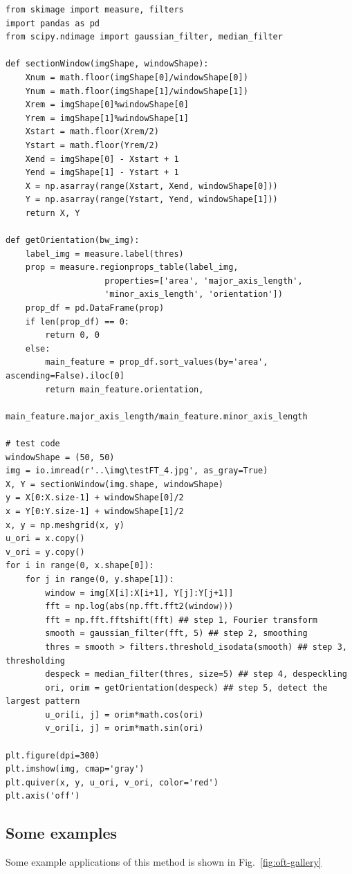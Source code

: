 \begin{verbatim}
from skimage import measure, filters
import pandas as pd
from scipy.ndimage import gaussian_filter, median_filter

def sectionWindow(imgShape, windowShape):
    Xnum = math.floor(imgShape[0]/windowShape[0])
    Ynum = math.floor(imgShape[1]/windowShape[1])
    Xrem = imgShape[0]%windowShape[0]
    Yrem = imgShape[1]%windowShape[1]
    Xstart = math.floor(Xrem/2)
    Ystart = math.floor(Yrem/2)
    Xend = imgShape[0] - Xstart + 1
    Yend = imgShape[1] - Ystart + 1
    X = np.asarray(range(Xstart, Xend, windowShape[0]))
    Y = np.asarray(range(Ystart, Yend, windowShape[1]))
    return X, Y

def getOrientation(bw_img):
    label_img = measure.label(thres)
    prop = measure.regionprops_table(label_img,
                    properties=['area', 'major_axis_length',
                    'minor_axis_length', 'orientation'])
    prop_df = pd.DataFrame(prop)
    if len(prop_df) == 0:
        return 0, 0
    else:
        main_feature = prop_df.sort_values(by='area', ascending=False).iloc[0]
        return main_feature.orientation,
              main_feature.major_axis_length/main_feature.minor_axis_length

# test code
windowShape = (50, 50)
img = io.imread(r'..\img\testFT_4.jpg', as_gray=True)
X, Y = sectionWindow(img.shape, windowShape)
y = X[0:X.size-1] + windowShape[0]/2
x = Y[0:Y.size-1] + windowShape[1]/2
x, y = np.meshgrid(x, y)
u_ori = x.copy()
v_ori = y.copy()
for i in range(0, x.shape[0]):
    for j in range(0, y.shape[1]):
        window = img[X[i]:X[i+1], Y[j]:Y[j+1]]
        fft = np.log(abs(np.fft.fft2(window)))
        fft = np.fft.fftshift(fft) ## step 1, Fourier transform
        smooth = gaussian_filter(fft, 5) ## step 2, smoothing
        thres = smooth > filters.threshold_isodata(smooth) ## step 3, thresholding
        despeck = median_filter(thres, size=5) ## step 4, despeckling
        ori, orim = getOrientation(despeck) ## step 5, detect the largest pattern
        u_ori[i, j] = orim*math.cos(ori)
        v_ori[i, j] = orim*math.sin(ori)

plt.figure(dpi=300)
plt.imshow(img, cmap='gray')
plt.quiver(x, y, u_ori, v_ori, color='red')
plt.axis('off')
\end{verbatim}

\subsection{Some examples}
\label{sec:oft-gallery}
Some example applications of this method is shown in Fig.~\ref{fig:oft-gallery}

